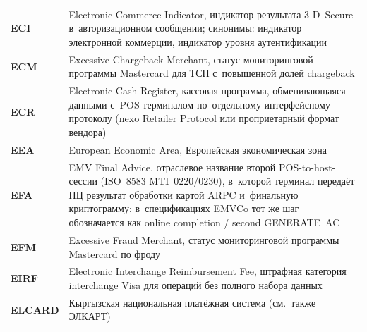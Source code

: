 \begin{longtable}{@{}p{4.5em}p{\dimexpr\linewidth-4.5em-2\tabcolsep\relax}@{}}
  \textbf{ECI}               & Electronic Commerce Indicator, индикатор результата 3-D~Secure в~авторизационном сообщении; синонимы: индикатор электронной коммерции, индикатор уровня аутентификации                                                                                                                           \\
  \textbf{ECM}               & Excessive Chargeback Merchant, статус мониторинговой программы Mastercard для ТСП с~повышенной долей chargeback                                                                                                                                                                                  \\
  \textbf{ECR}               & Electronic Cash Register, кассовая программа, обменивающаяся данными с~POS-терминалом по~отдельному интерфейсному протоколу (nexo Retailer Protocol или проприетарный формат вендора)                                                                                                                       \\
  \textbf{EEA}               & European Economic Area, Европейская экономическая зона                                                                                                                                                                                                                                           \\
  \textbf{EFA}               & EMV Final Advice, отраслевое название второй POS-to-host-сессии (ISO~8583 MTI~0220/0230), в~которой терминал передаёт ПЦ результат обработки картой ARPC и~финальную криптограмму; в~спецификациях EMVCo тот же шаг обозначается как online completion / second GENERATE~AC                  \\
  \textbf{EFM}               & Excessive Fraud Merchant, статус мониторинговой программы Mastercard по фроду                                                                                                                                                                                                                    \\
  \textbf{EIRF}              & Electronic Interchange Reimbursement Fee, штрафная категория interchange Visa для операций без полного набора данных                                                                                                                                                                             \\
  \textbf{ELCARD}            & Кыргызская национальная платёжная система (см.~также ЭЛКАРТ)                                                                                                                                                                                                                                     \\

\end{longtable}
